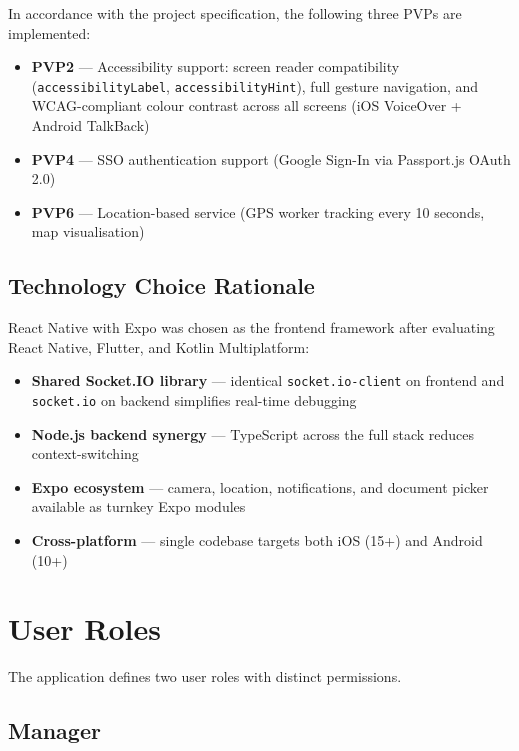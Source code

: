 \documentclass[12pt,a4paper]{article}
\begin{document}
In accordance with the project specification, the following three PVPs are implemented:

\begin{itemize}[noitemsep]
    \item \textbf{PVP2} --- Accessibility support: screen reader compatibility (\texttt{accessibilityLabel}, \texttt{accessibilityHint}), full gesture navigation, and WCAG-compliant colour contrast across all screens (iOS VoiceOver + Android TalkBack)
    \item \textbf{PVP4} --- SSO authentication support (Google Sign-In via Passport.js OAuth 2.0)
    \item \textbf{PVP6} --- Location-based service (GPS worker tracking every 10 seconds, map visualisation)
\end{itemize}

\subsection{Technology Choice Rationale}

React Native with Expo was chosen as the frontend framework after evaluating React Native, Flutter, and Kotlin Multiplatform:

\begin{itemize}[noitemsep]
    \item \textbf{Shared Socket.IO library} --- identical \texttt{socket.io-client} on frontend and \texttt{socket.io} on backend simplifies real-time debugging
    \item \textbf{Node.js backend synergy} --- TypeScript across the full stack reduces context-switching
    \item \textbf{Expo ecosystem} --- camera, location, notifications, and document picker available as turnkey Expo modules
    \item \textbf{Cross-platform} --- single codebase targets both iOS (15+) and Android (10+)
\end{itemize}

\section{User Roles}

The application defines two user roles with distinct permissions.

\subsection{Manager}
\end{document}
